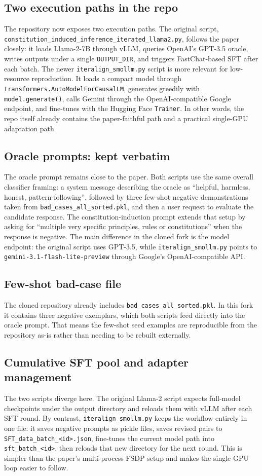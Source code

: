 \documentclass[11pt]{article}
\begin{document}
\subsection{Two execution paths in the repo}
The repository now exposes two execution paths. The original script, \texttt{constitution\_induced\_inference\_iterated\_llama2.py}, follows the paper closely: it loads Llama-2-7B through vLLM, queries OpenAI's GPT-3.5 oracle, writes outputs under a single \texttt{OUTPUT\_DIR}, and triggers FastChat-based SFT after each batch. The newer \texttt{iteralign\_smollm.py} script is more relevant for low-resource reproduction. It loads a compact model through \texttt{transformers.AutoModelForCausalLM}, generates greedily with \texttt{model.generate()}, calls Gemini through the OpenAI-compatible Google endpoint, and fine-tunes with the Hugging Face \texttt{Trainer}. In other words, the repo itself already contains the paper-faithful path and a practical single-GPU adaptation path.

\subsection{Oracle prompts: kept verbatim}
The oracle prompt remains close to the paper. Both scripts use the same overall classifier framing: a system message describing the oracle as ``helpful, harmless, honest, pattern-following'', followed by three few-shot negative demonstrations taken from \texttt{bad\_cases\_all\_sorted.pkl}, and then a user request to evaluate the candidate response. The constitution-induction prompt extends that setup by asking for ``multiple very specific principles, rules or constitutions'' when the response is negative. The main difference in the cloned fork is the model endpoint: the original script uses GPT-3.5, while \texttt{iteralign\_smollm.py} points to \texttt{gemini-3.1-flash-lite-preview} through Google's OpenAI-compatible API.

\subsection{Few-shot bad-case file}
The cloned repository already includes \texttt{bad\_cases\_all\_sorted.pkl}. In this fork it contains three negative exemplars, which both scripts feed directly into the oracle prompt. That means the few-shot seed examples are reproducible from the repository as-is rather than needing to be rebuilt externally.

\subsection{Cumulative SFT pool and adapter management}
The two scripts diverge here. The original Llama-2 script expects full-model checkpoints under the output directory and reloads them with vLLM after each SFT round. By contrast, \texttt{iteralign\_smollm.py} keeps the workflow entirely in one file: it saves negative prompts as pickle files, saves revised pairs to \texttt{SFT\_data\_batch\_<id>.json}, fine-tunes the current model path into \texttt{sft\_batch\_<id>}, then reloads that new directory for the next round. This is simpler than the paper's multi-process FSDP setup and makes the single-GPU loop easier to follow.
\end{document}
